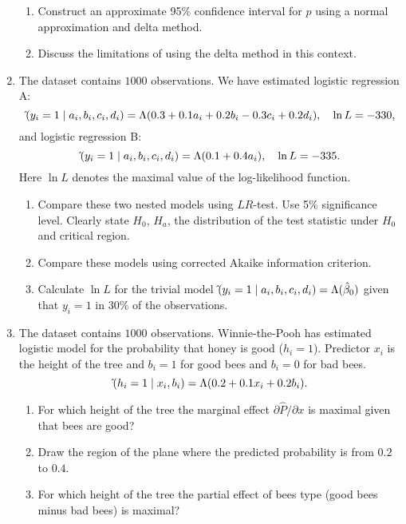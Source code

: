 \documentclass[12pt]{article}
\let\P\relax
\DeclareMathOperator{\P}{\mathbb{P}}
\newcommand{\hb}{\hat\beta}
\begin{document}
\begin{enumerate}
\begin{enumerate}
        \item Construct an approximate 95\% confidence interval for $p$ using a normal approximation and delta method.
    
        \item Discuss the limitations of using the delta method in this context.
    \end{enumerate}
    \item The dataset contains $1000$ observations. 
    We have estimated logistic regression A:
    \[
    \hat\P(y_i = 1 \mid a_i, b_i, c_i, d_i) = \Lambda(0.3 + 0.1 a_i + 0.2 b_i - 0.3 c_i + 0.2 d_i), \quad \ln L = -330,
    \]
    and logistic regression B:
    \[
    \hat\P(y_i = 1 \mid a_i, b_i, c_i, d_i) = \Lambda(0.1 + 0.4 a_i), \quad \ln L = -335.
    \]
    Here $\ln L$ denotes the maximal value of the log-likelihood function. 
    \begin{enumerate}
        \item Compare these two nested models using $LR$-test. 
        Use 5\% significance level.
        Clearly state $H_0$, $H_a$, the distribution of the test statistic under $H_0$ and critical region.
        \item Compare these models using corrected Akaike information criterion. 
        \item Calculate $\ln L$ for the trivial model $\hat\P(y_i = 1 \mid a_i, b_i, c_i, d_i) = \Lambda(\hb_0)$ given that $y_i = 1$ in $30\%$ of the observations.
    \end{enumerate}


    \item The dataset contains $1000$ observations. 
    Winnie-the-Pooh has estimated logistic model for the probability that honey is good ($h_i = 1$).
    Predictor $x_i$ is the height of the tree and $b_i = 1$ for good bees and $b_i = 0$ for bad bees.
    \[
    \hat \P(h_i = 1 \mid x_i, b_i ) = \Lambda(0.2 + 0.1 x_i + 0.2 b_i).
    \]
    \begin{enumerate}
        \item For which height of the tree the marginal effect $\partial \hat P/\partial x$ is maximal given that bees are good?
        \item Draw the region of the plane where the predicted probability is from $0.2$ to $0.4$.
        \item For which height of the tree the partial effect of bees type (good bees minus bad bees) is maximal?
    \end{enumerate}


\end{enumerate}
\end{document}
